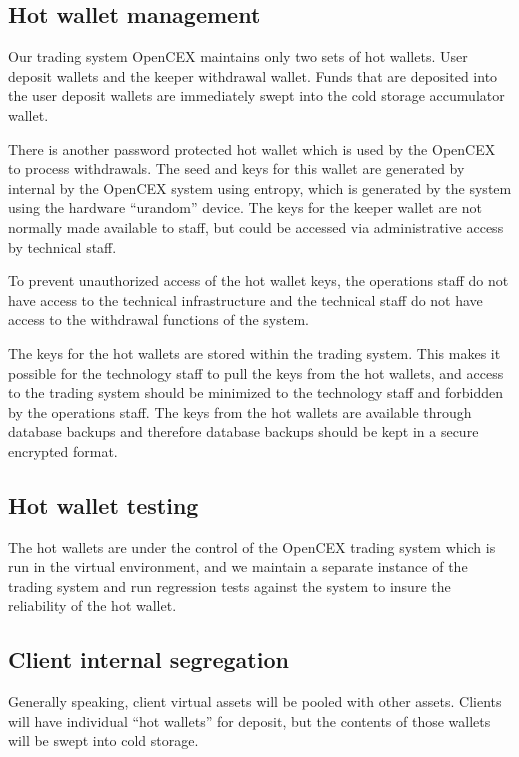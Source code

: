 \subsection{Hot wallet management}
Our trading system OpenCEX maintains only two sets of hot
wallets.  User deposit wallets and the keeper withdrawal wallet.
Funds that are deposited into the user deposit wallets are immediately
swept into the cold storage accumulator wallet.

There is another password protected hot wallet which is used by the
OpenCEX to process withdrawals.  The seed and keys for this wallet are
generated by internal by the OpenCEX system using entropy, which is
generated by the system using the hardware ``urandom'' device.  The
keys for the keeper wallet are not normally made available to staff,
but could be accessed via administrative access by technical staff.

To prevent unauthorized access of the hot wallet keys, the
operations staff do not have access to the technical infrastructure
and the technical staff do not have access to the withdrawal functions
of the system.

The keys for the hot wallets are stored within the trading system.
This makes it possible for the technology staff to pull the keys from
the hot wallets, and access to the trading system should be
minimized to the technology staff and forbidden by the operations
staff.  The keys from the hot wallets are available through database
backups and therefore database backups should be kept in a secure
encrypted format.

\subsection{Hot wallet testing}
The hot wallets are under the control of the OpenCEX trading system
which is run in the virtual environment, and we maintain a separate
instance of the trading system and run regression tests against the
system to insure the reliability of the hot wallet.


\subsection{Client internal segregation}
Generally speaking, client virtual assets will be pooled with other
assets.  Clients will have individual ``hot wallets'' for deposit, but
the contents of those wallets will be swept into cold storage.

